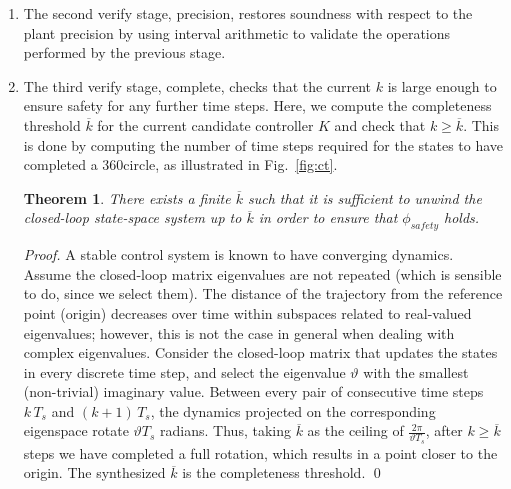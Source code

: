 \documentclass[twocolumn]{autart}    %
\newtheorem{theorem}{Theorem}
\newtheorem{proof}{Proof}
\begin{document}
\begin{enumerate}
\item The second {\sc verify} stage, {\sc precision}, 
 restores soundness with respect to the plant precision
by using interval arithmetic \cite{moore1966interval} to validate the 
operations performed by the previous stage. 

\item The third {\sc verify} stage, {\sc complete}, checks that the current
$k$ is large enough to ensure safety for any further time steps.  
Here, we compute the completeness threshold $\overline{k}$ for the current candidate controller $K$ and
check that $k{\geq}\overline{k}$.  This is done by computing the number of time steps
required for the states to have completed a 360\textdegree circle, as illustrated in Fig.~\ref{fig:ct}. 

\begin{theorem} There exists a finite $\overline{k}$ such that it is
sufficient to unwind the closed-loop state-space system up to $\overline{k}$
in order to ensure that $\phi_\mathit{safety}$ holds. 
\end{theorem}

\begin{proof}
%
A stable control system is known to have converging dynamics.  Assume the
closed-loop matrix eigenvalues are not repeated (which is sensible to do,
since we select them).  The distance of the trajectory from the reference
point (origin) decreases over time within subspaces related to real-valued
eigenvalues; however, this is not the case in general when dealing with
complex eigenvalues.  Consider the closed-loop matrix that updates the
states in every discrete time step, and select the eigenvalue $\vartheta$
with the smallest (non-trivial) imaginary value.  Between every pair of
consecutive time steps $k\,T_s$ and $(k+1)\,T_s$, the dynamics projected on
the corresponding eigenspace rotate $\vartheta T_s$ radians.  Thus, taking
$\overline{k}$ as the ceiling of $\frac{2\pi}{\vartheta T_s}$, after
$k{\geq}\overline{k}$ steps we have completed a full rotation, which results
in a point closer to the origin.  The synthesized $\overline{k}$ is the completeness threshold.
\qed 
%
\end{proof}

\end{enumerate}
\end{document}
